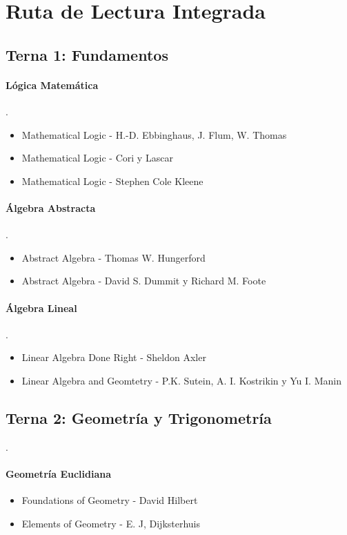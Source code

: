 \documentclass{article}
\begin{document}
\section*{Ruta de Lectura Integrada}
\subsection*{Terna 1: Fundamentos}
\paragraph*{L\'ogica Matem\'atica}.
\begin{itemize}
	\item Mathematical Logic - H.-D. Ebbinghaus, J. Flum, W. Thomas
	\item Mathematical Logic - Cori y Lascar
	\item Mathematical Logic - Stephen Cole Kleene
\end{itemize}
\paragraph*{\'Algebra Abstracta}.
\begin{itemize}
	\item Abstract Algebra - Thomas W. Hungerford
	\item Abstract Algebra - David S. Dummit y Richard M. Foote
\end{itemize}
\paragraph*{\'Algebra Lineal}.
\begin{itemize}
	\item Linear Algebra Done Right - Sheldon Axler
	\item Linear Algebra and Geomtetry - P.K. Sutein, A. I. Kostrikin y Yu I. Manin
\end{itemize}
\subsection*{Terna 2: Geometr\'ia y Trigonometr\'ia}.
\paragraph*{Geometr\'ia Euclidiana}
\begin{itemize}
	\item Foundations of Geometry - David Hilbert
	\item Elements of Geometry - E. J, Dijksterhuis
\end{itemize}
\end{document}
